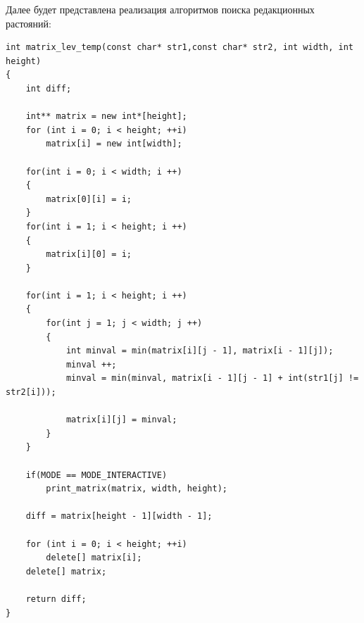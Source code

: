 Далее будет представлена реализация алгоритмов поиска редакционных растояний:

\begin{lstlisting}[caption=Матричный алгоритм поиска расстояния Левенштейна]
int matrix_lev_temp(const char* str1,const char* str2, int width, int height)
{
    int diff;

    int** matrix = new int*[height];
    for (int i = 0; i < height; ++i)
        matrix[i] = new int[width];

    for(int i = 0; i < width; i ++)
    {
        matrix[0][i] = i;
    }
    for(int i = 1; i < height; i ++)
    {
        matrix[i][0] = i;
    }

    for(int i = 1; i < height; i ++)
    {
        for(int j = 1; j < width; j ++)
        {
            int minval = min(matrix[i][j - 1], matrix[i - 1][j]);
            minval ++;
            minval = min(minval, matrix[i - 1][j - 1] + int(str1[j] != str2[i]));

            matrix[i][j] = minval;
        }
    }

    if(MODE == MODE_INTERACTIVE)
        print_matrix(matrix, width, height);

    diff = matrix[height - 1][width - 1];

    for (int i = 0; i < height; ++i)
        delete[] matrix[i];    
    delete[] matrix;

    return diff;
}
\end{lstlisting}

\clearpage

